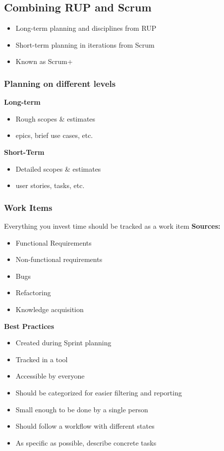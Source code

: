 \subsection{Combining RUP and Scrum}
\begin{itemize}
    \item Long-term planning and disciplines from RUP
    \item Short-term planning in iterations from Scrum
    \item Known as Scrum+
\end{itemize}
\subsubsection{Planning on different levels}
\textbf{Long-term}
\begin{itemize}
    \item Rough scopes \& estimates
    \item epics, brief use cases, etc.
\end{itemize}
\textbf{Short-Term}
\begin{itemize}
    \item Detailed scopes \& estimates
    \item user stories, tasks, etc.
\end{itemize}

\subsubsection{Work Items}
Everything you invest time should be tracked as a work item
\textbf{Sources:}
\begin{itemize}
    \item Functional Requirements
    \item Non-functional requirements
    \item Bugs
    \item Refactoring
    \item Knowledge acquisition
\end{itemize}
\textbf{Best Practices}
\begin{itemize}
    \item Created during Sprint planning
    \item Tracked in a tool
    \item Accessible by everyone
    \item Should be categorized for easier filtering and reporting
    \item Small enough to be done by a single person
    \item Should follow a workflow with different states
    \item As specific as possible, describe concrete tasks
\end{itemize}

